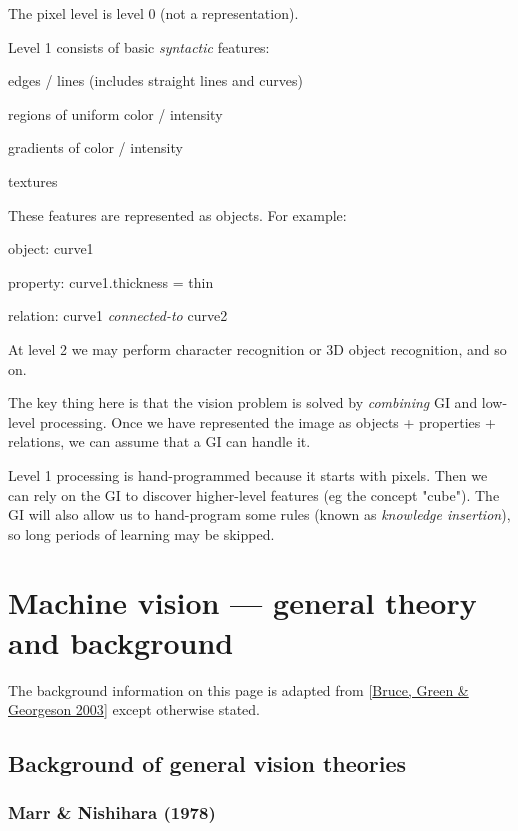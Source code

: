 The pixel level is level 0 (not a representation).

 Level 1 consists of basic \emph{syntactic} features:
\begin{compactenum-}
	\item edges / lines (includes straight lines and curves)
	\item regions of uniform color / intensity
	\item gradients of color / intensity
	\item textures
\end{compactenum-}

These features are represented as objects. For example:
\begin{compactenum-}
	\item object: curve1
	\item property: curve1.thickness = thin
	\item relation: curve1 \emph{connected-to} curve2
\end{compactenum-}

At level 2 we may perform character recognition or 3D object recognition, and so on. 

The key thing here is that the vision problem is solved by  \emph{combining} GI and low-level processing. Once we have represented the image as objects + properties + relations, we can assume that a GI can handle it.

Level 1 processing is hand-programmed because it starts with pixels. Then we can rely on the GI to discover higher-level features (eg the concept "cube"). The GI will also allow us to hand-program some rules (known as \emph{knowledge insertion}), so  long periods of learning may be skipped.

\section{Machine vision --- general theory and background}

The background information on this page is adapted from [\hyperlink{ref}{Bruce, Green \& Georgeson 2003}] except otherwise stated.

\subsection{Background of general vision theories}

\subsubsection{Marr \& Nishihara (1978)}

